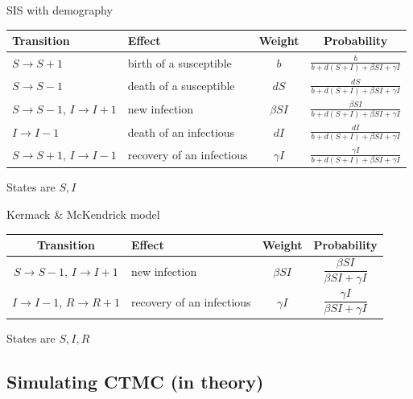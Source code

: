 \documentclass[aspectratio=169]{beamer}
\begin{document}
\begin{frame}{SIS with demography}
    \begin{center}
        \begin{tabular}{p{3cm}p{3cm}cc}
        \toprule
            Transition & Effect & Weight & Probability \\
          \midrule
            $S\to S+1$ & birth of a susceptible & $b$ & $\frac{b}{b+d(S+I)+\beta SI+\gamma I}$ \\
            $S\to S-1$ & death of a susceptible & $dS$ & $\frac{dS}{b+d(S+I)+\beta SI+\gamma I}$ \\
            $S\to S-1$, $I\to I+1$ & new infection & $\beta SI$ & $\frac{\beta SI}{b+d(S+I)+\beta SI+\gamma I}$ \\
            $I\to I-1$ & death of an infectious & $dI$ & $\frac{dI}{b+d(S+I)+\beta SI+\gamma I}$ \\
            $S\to S+1$, $I\to I-1$ & recovery of an infectious & $\gamma I$ & $\frac{\gamma I}{b+d(S+I)+\beta SI+\gamma I}$ \\
            \bottomrule
        \end{tabular}
    \end{center}
\vfill
States are $S,I$
\end{frame}


\begin{frame}[fragile]{Kermack \& McKendrick model}
    \begin{center}
        \begin{tabular}{cp{3cm}cc}
        \toprule
            Transition & Effect & Weight & Probability \\
            \midrule
            $S\to S-1$, $I\to I+1$ & new infection & $\beta SI$ & $\dfrac{\beta SI}{\beta SI+\gamma I}$ \\
            $I\to I-1$, $R\to R+1$ & recovery of an infectious & $\gamma I$ & $\dfrac{\gamma I}{\beta SI+\gamma I}$ \\
            \bottomrule
        \end{tabular}
    \end{center}
    \vfill
    States are $S,I,R$
\end{frame}


\subsection{Simulating CTMC (in theory)}
\end{document}
